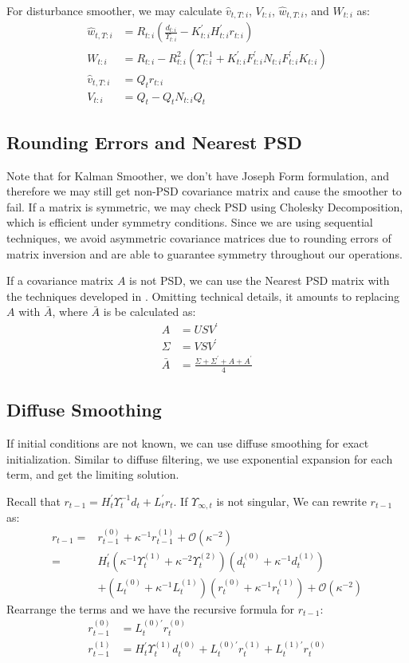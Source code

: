 \documentclass[12pt]{article}
\numberwithin{equation}{section}
\begin{document}
For disturbance smoother, we may calculate $\hat{v}_{t,T:i}$, $V_{t:i}$, $\hat{w}_{t,T:i}$, and $W_{t:i}$ as:
\begin{align}
    \hat{w}_{t,T:i} &= R_{t:i}(\frac{d_{t:i}}{\Upsilon_{t:i}}-K_{t:i}^{'}H_{t:i}^{'}r_{t:i}) \\
    W_{t:i} &= R_{t:i} - R_{t:i}^2(\Upsilon_{t:i}^{-1}+K_{t:i}^{'}F_{t:i}^{'}N_{t:i}F_{t:i}^{'}K_{t:i})  \\
    \hat{v}_{t,T:i} &= Q_tr_{t:i} \\
    V_{t:i} &= Q_t - Q_tN_{t:i}Q_t
\end{align}

\subsection{Rounding Errors and Nearest PSD}
Note that for Kalman Smoother, we don't have Joseph Form formulation, and therefore we may still get non-PSD covariance matrix and cause the smoother to fail. If a matrix is symmetric, we may check PSD using Cholesky Decomposition, which is efficient under symmetry conditions. Since we are using sequential techniques, we avoid asymmetric covariance matrices due to rounding errors of matrix inversion and are able to guarantee symmetry throughout our operations. 

If a covariance matrix $A$ is not PSD, we can use the Nearest PSD matrix with the techniques developed in \cite{higham_1988}. Omitting technical details, it amounts to replacing $A$ with $\bar{A}$, where $\bar{A}$ is be calculated as:
\begin{align*}
    A &= USV^{'} \\
    \Sigma &= VSV^{'} \\
    \bar{A} &= \frac{\Sigma + \Sigma^{'} + A + A^{'}}{4}
\end{align*}

\subsection{Diffuse Smoothing}
If initial conditions are not known, we can use diffuse smoothing for exact initialization. Similar to diffuse filtering, we use exponential expansion for each term, and get the limiting solution.  

Recall that $r_{t-1} = H_t^{'}\Upsilon_t^{-1}d_t + L_t^{'}r_t$. If $\Upsilon_{\infty,t}$ is not singular, We can rewrite $r_{t-1}$ as:
\begin{align*}
    r_{t-1} =& r_{t-1}^{(0)} + \kappa^{-1}r_{t-1}^{(1)}+\mathcal{O}(\kappa^{-2}) \\
    =& H_t^{'}(\kappa^{-1}\Upsilon_t^{(1)}+\kappa^{-2}\Upsilon_{t}^{(2)})(d_t^{(0)} + \kappa^{-1}d_t^{(1)}) \\
    &+ (L_t^{(0)} + \kappa^{-1}L_t^{(1)})(r_t^{(0)}+\kappa^{-1}r_t^{(1)}) + \mathcal{O}(\kappa^{-2})
\end{align*}
Rearrange the terms and we have the recursive formula for $r_{t-1}$:
\begin{align*}
    r_{t-1}^{(0)} &= L_t^{(0)'}r_t^{(0)} \\
    r_{t-1}^{(1)} &= H_t^{'}\Upsilon_t^{(1)}d_t^{(0)} + L_t^{(0)'}r_t^{(1)} + L_t^{(1)'}r_t^{(0)}
\end{align*}
\end{document}
